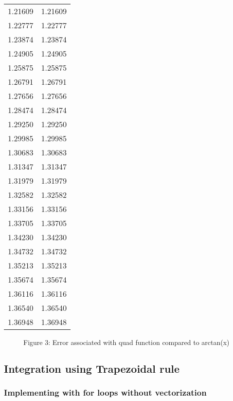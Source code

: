 \documentclass[a4paper]{article}
\begin{document}
\begin{table}[H]
\begin{tabular}{|c|c|}
 1.21609 & 1.21609 \\
 1.22777 & 1.22777 \\
 1.23874 & 1.23874 \\
 1.24905 & 1.24905 \\
 1.25875 & 1.25875 \\
 1.26791 & 1.26791 \\
 1.27656 & 1.27656 \\
 1.28474 & 1.28474 \\
 1.29250 & 1.29250 \\
 1.29985 & 1.29985 \\
 1.30683 & 1.30683 \\
 1.31347 & 1.31347 \\
 1.31979 & 1.31979 \\
 1.32582 & 1.32582 \\
 1.33156 & 1.33156 \\
 1.33705 & 1.33705 \\
 1.34230 & 1.34230 \\
 1.34732 & 1.34732 \\
 1.35213 & 1.35213 \\
 1.35674 & 1.35674 \\
 1.36116 & 1.36116 \\
 1.36540 & 1.36540 \\
 1.36948 & 1.36948 \\
    \hline
    \end{tabular}
    \end{table}
    
	
	\begin{figure}[H]
    \centering
    \caption{Figure 3: Error associated with quad function compared to arctan(x)}
	\end{figure}
    
     \subsection{Integration using Trapezoidal rule}
     \subsubsection{Implementing with for loops without vectorization}
        
\end{document}

